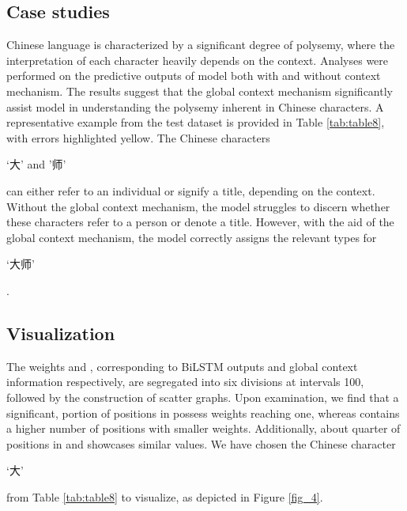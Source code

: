 \documentclass[lettersize,journal]{IEEEtran}
\begin{document}
\subsection{Case studies}
Chinese language is characterized by a significant degree of polysemy, where the interpretation of each character heavily depends on the context. Analyses were performed on the predictive outputs of model both with and without context mechanism. The results suggest that the global context mechanism significantly assist model in understanding the polysemy inherent in Chinese characters. A representative example from the test dataset is provided in Table \ref{tab:table8}, with errors highlighted yellow. The Chinese characters \begin{CJK*}{UTF8}{gbsn}‘大’ and ’师’ \end{CJK*}can either refer to an individual or signify a title, depending on the context. Without the global context mechanism, the model struggles to discern whether these characters refer to a person or denote a title. However, with the aid of the global context mechanism, the model correctly assigns the relevant types for \begin{CJK*}{UTF8}{gbsn}‘大师’ \end{CJK*}. 

\subsection{Visualization}
The weights  and , corresponding to BiLSTM outputs and global context information respectively, are segregated into six divisions at intervals 100, followed by the construction of scatter graphs. Upon examination, we find that a significant, portion of positions in  possess weights reaching one, whereas  contains a higher number of positions with smaller weights. Additionally, about quarter of positions in  and  showcases similar values. We have chosen the Chinese character  \begin{CJK*}{UTF8}{gbsn}‘大’ \end{CJK*} from Table \ref{tab:table8} to visualize, as depicted in Figure \ref{fig_4}.
\end{document}
